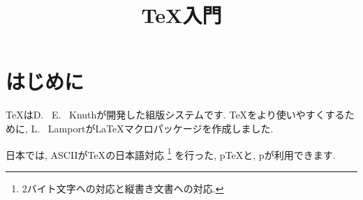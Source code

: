 \documentclass{jarticle}
\title{{\TeX}入門}
\author{平田\hskip1zw 蓮}
\begin{document}
\maketitle
\section{はじめに}
{\TeX}はD. ~E. ~Knuthが開発した組版システムです. 
{\TeX}をより使いやすくするために, 
L. ~Lamportが{\LaTeX}マクロパッケージを作成しました. 

日本では, ASCIIが{\TeX}の日本語対応%
\footnote{2バイト文字への対応と縦書き文書への対応. }%
を行った, p{\TeX}と, p{\LaTeXe}が利用できます. 
\end{document}
